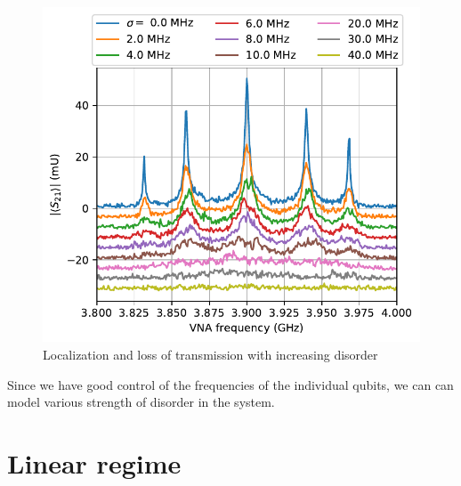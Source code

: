 \documentclass[%
 aps, pra,
 amsmath,amssymb,
 reprint,%
superscriptaddress
]{revtex4-2}
\begin{document}
\begin{figure}
	\includegraphics[width=1\linewidth]{Pictures/mbl}
	\caption{Localization and loss of transmission with increasing disorder}
	\label{fig:mbl}
\end{figure}


Since we have good control of the frequencies of the individual qubits, we can can model various strength of disorder in the system. 




\appendix

\section{Linear regime} \label{sec:app_linear}
\end{document}

